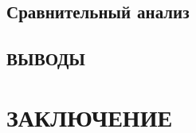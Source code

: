 \subsection{Сравнительный анализ}

\subsection*{ВЫВОДЫ}


\newpage
\section*{ЗАКЛЮЧЕНИЕ}


\newpage
